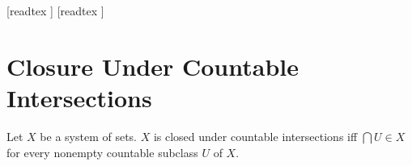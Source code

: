 \documentclass[10pt]{article}
\begin{document}
  \begin{imports}
    \begin{forthel}
      [readtex ]
      [readtex ]
    \end{forthel}
  \end{imports}


  \section*{Closure Under Countable Intersections}

  \begin{forthel}
    \begin{definition}
      Let $X$ be a system of sets.
      $X$ is closed under countable intersections iff $\bigcap U \in X$ for every nonempty countable subclass $U$ of $X$.
    \end{definition}
  \end{forthel}
\end{document}
